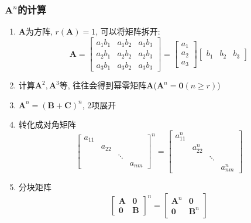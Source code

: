 \subsubsection{$ \bm{A}^{n} $的计算}
\begin{enumerate}
\item $ \bm{A} $为方阵, $ r(\bm{A})=1 $, 可以将矩阵拆开:
\begin{equation*}
\bm{A}=
\begin{bmatrix}
a_{1}b_{1} & a_{1}b_{2} & a_{1}b_{3} \\
a_{2}b_{1} & a_{2}b_{2} & a_{2}b_{3} \\
a_{3}b_{1} & a_{3}b_{2} & a_{3}b_{3}
\end{bmatrix}=
\begin{bmatrix}
a_{1} \\
a_{2} \\
a_{3}
\end{bmatrix}
\begin{bmatrix}
b_{1} & b_{2} & b_{3}
\end{bmatrix}
\end{equation*}
\item 计算$ \bm{A}^{2},\bm{A}^{3} $等, 往往会得到幂零矩阵$ \bm{A} $($ \bm{A}^{n}=\bm{0}(n\ge r) $)
\item $ \bm{A}^{n}=(\bm{B}+\bm{C})^{n}$, 2项展开
\item 转化成对角矩阵
\begin{equation*}
\begin{bmatrix}
a_{11} & & & \\
& a_{22} & & \\
& & \ddots & \\
& & & a_{nm}
\end{bmatrix}^{n}=
\begin{bmatrix}
a_{11}^{n} & & & \\
& a_{22}^{n} & & \\
& & \ddots & \\
& & & a_{nm}^{n}
\end{bmatrix}
\end{equation*}
\item 分块矩阵
\begin{equation*}
\begin{bmatrix}
\bm{A} & \bm{0} \\
\bm{0} & \bm{B} 
\end{bmatrix}^{n}=
\begin{bmatrix}
\bm{A}^{n} & \bm{0} \\
\bm{0} & \bm{B}^{n}
\end{bmatrix}
\end{equation*}
\end{enumerate}
